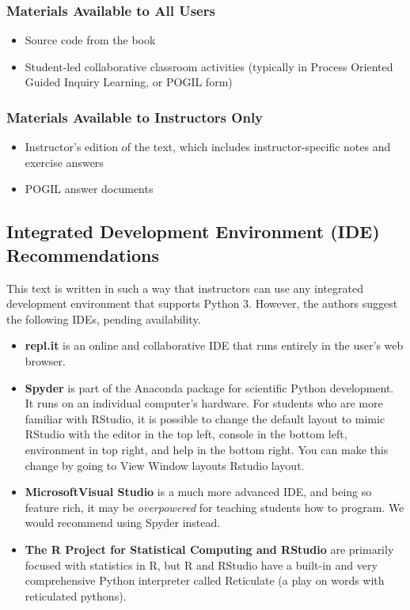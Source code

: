 \subsubsection*{Materials Available to All Users}
\begin{itemize}
    \item {Source code from the book}
    \item {Student-led collaborative classroom activities (typically in Process Oriented Guided Inquiry Learning, or POGIL form)}
\end{itemize}
\subsubsection*{Materials Available to Instructors Only}
\begin{itemize}
    \item {Instructor's edition of the text, which includes instructor-specific notes and exercise answers}
    \item {POGIL answer documents}
\end{itemize}
\subsection*{Integrated Development Environment (IDE) Recommendations}
This text is written in such a way that instructors can use any integrated development environment that supports Python 3. However, the authors suggest the following IDEs, pending availability.
\begin{itemize}
    \item {\textbf{repl.it\textregistered} is an online and collaborative IDE that runs entirely in the user's web browser.}
    \item {\textbf{Spyder} is part of the Anaconda package for scientific Python development. It runs on an individual computer's hardware. For students who are more familiar with RStudio, it is possible to change the default layout to mimic RStudio with the editor in the top left, console in the bottom left, environment in top right, and help in the bottom right. You can make this change by going to View \textrangle{} Window layouts \textrangle{} Rstudio layout.}
    \item {\textbf{Microsoft\textregistered Visual Studio} is a much more advanced IDE, and being so feature rich, it may be \textit{overpowered} for teaching students how to program. We would recommend using Spyder instead.}
    \item {\textbf{The R Project for Statistical Computing and RStudio} are primarily focused with statistics in R, but R and RStudio have a built-in and very comprehensive Python interpreter called Reticulate (a play on words with reticulated pythons).}
\end{itemize}
